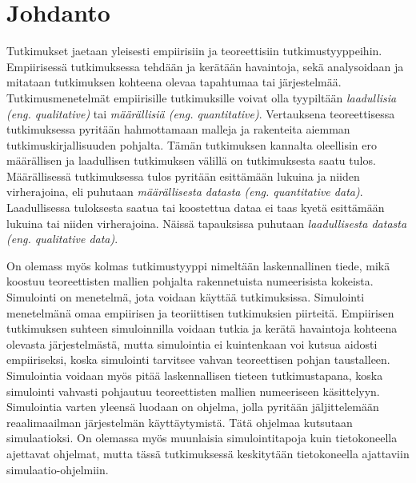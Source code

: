 \documentclass[utf8]{gradu3}
\begin{document}
\author{Jaakko Palm}

\maketitle

\mainmatter

\chapter{Johdanto} \label{johdanto}
Tutkimukset jaetaan yleisesti empiirisiin ja teoreettisiin tutkimustyyppeihin.
Empiirisessä tutkimuksessa tehdään ja kerätään havaintoja, sekä analysoidaan 
ja mitataan tutkimuksen kohteena olevaa tapahtumaa tai järjestelmää. 
Tutkimusmenetelmät empiirisille tutkimuksille voivat olla 
tyypiltään \textit{laadullisia (eng. qualitative)} 
tai \textit{määrällisiä (eng. quantitative)}. 
Vertauksena teoreettisessa tutkimuksessa pyritään hahmottamaan 
malleja ja rakenteita aiemman tutkimuskirjallisuuden pohjalta. 
Tämän tutkimuksen kannalta oleellisin ero määrällisen ja laadullisen tutkimuksen 
välillä on tutkimuksesta saatu tulos.
Määrällisessä tutkimuksessa tulos pyritään esittämään lukuina ja niiden virherajoina,
eli puhutaan \textit{määrällisesta datasta (eng. quantitative data)}. 
Laadullisessa tuloksesta saatua tai koostettua dataa ei taas kyetä esittämään 
lukuina tai niiden virherajoina. Näissä tapauksissa puhutaan 
\textit{laadullisesta datasta (eng. qualitative data)}.

On olemass myös kolmas tutkimustyyppi nimeltään laskennallinen tiede, 
mikä koostuu teoreettisten mallien pohjalta rakennetuista numeerisista kokeista. 
Simulointi on menetelmä, jota voidaan käyttää tutkimuksissa.
Simulointi menetelmänä omaa empiirisen ja teoriittisen tutkimuksien piirteitä.
Empiirisen tutkimuksen suhteen simuloinnilla voidaan tutkia ja kerätä havaintoja
kohteena olevasta järjestelmästä, mutta simulointia ei 
kuintenkaan voi kutsua aidosti empiiriseksi,
koska simulointi tarvitsee vahvan teoreettisen pohjan taustalleen.
Simulointia voidaan myös pitää laskennallisen tieteen tutkimustapana, 
koska simulointi vahvasti pohjautuu teoreettisten mallien numeeriseen käsittelyyn.
Simulointia varten yleensä luodaan on ohjelma, 
jolla pyritään jäljittelemään reaalimaailman järjestelmän käyttäytymistä.
Tätä ohjelmaa kutsutaan simulaatioksi.
On olemassa myös muunlaisia simulointitapoja kuin tietokoneella ajettavat ohjelmat, mutta 
tässä tutkimuksessä keskitytään tietokoneella ajattaviin simulaatio-ohjelmiin.
\end{document}
